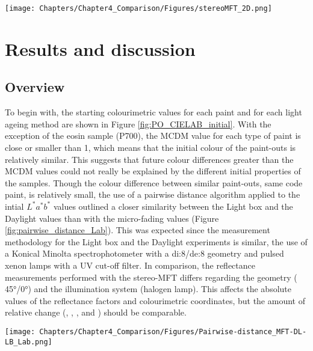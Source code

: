 \begin{figure*}
\centering
\texttt{[image: Chapters/Chapter4\_Comparison/Figures/stereoMFT\_2D.png]}
\caption[\hspace{0.3cm}2D representation of the stereo-MFT]{2D representation of the stereo-MFT in the co-axial mode: configuration used to perform microfading analyses on samples mentioned in Table \ref{tab:MFT_info_PO}.}
\label{fig:MFT-setup_2D_02}
\end{figure*}

\newpage
\section{Results and discussion}

\subsection{Overview}

To begin with, the starting colourimetric values for each paint and for each light ageing method are shown in Figure \ref{fig:PO_CIELAB_initial}. With the exception of the eosin sample (P700), the \gls{MCDM} value for each type of paint is close or smaller than 1, which means that the initial colour of the paint-outs is relatively similar. This suggests that future colour differences greater than the \gls{MCDM} values could not really be explained by the different initial properties of the samples. Though the colour difference between similar paint-outs, \ie same code paint, is relatively small, the use of a pairwise distance algorithm applied to the intial $L^*a^*b^*$ values outlined a closer similarity between the Light box and the Daylight values than with the micro-fading values (Figure \ref{fig:pairwise_distance_Lab}). This was expected since the measurement methodology for the Light box and the Daylight experiments is similar, \ie the use of a Konical Minolta spectrophotometer with a di:8/de:8 geometry and pulsed xenon lamps with a \gls{UV} cut-off filter. In comparison, the reflectance measurements performed with the stereo-MFT differs regarding the geometry ( \ang{45}/\ang{0}) and the illumination system (halogen lamp). This affects the absolute values of the reflectance factors and colourimetric coordinates, but the amount of relative change (\dE, \dL, \da, and \db) should be comparable. \\

\begin{figure*}[!h]
\centering
\texttt{[image: Chapters/Chapter4\_Comparison/Figures/Pairwise-distance\_MFT-DL-LB\_Lab.png]}
\caption[\hspace{0.3cm}Pairwise distance computation on initial $L^*a^*b^*$ values]{Results of pairwise distance computation applied to the initial $L^*a^*b^*$ values (Dark blue colour indicates a strong similarity while yellow denotes dissimilarity).}
\label{fig:pairwise_distance_Lab}
\end{figure*}

